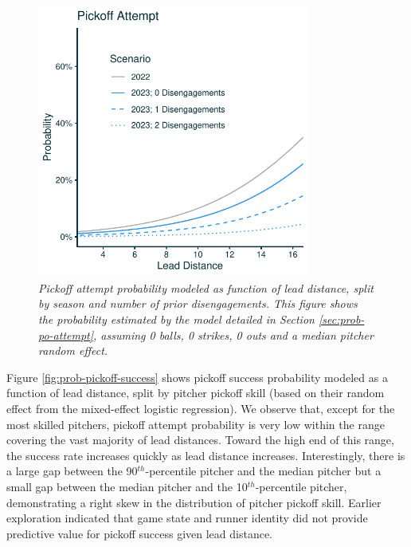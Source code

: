 \documentclass{article}
\begin{document}
      \begin{figure}
        \centering
        \includegraphics[width = 0.8\textwidth]{../../output/figures/prob_po_attempt_light.pdf}
        \caption{
          \it Pickoff attempt probability modeled as function of lead distance, split by season and number of prior disengagements. This figure shows the probability estimated by the model detailed in Section \ref{sec:prob-po-attempt}, assuming 0 balls, 0 strikes, 0 outs and a median pitcher random effect.
        }
        \label{fig:prob-pickoff-attempt}
      \end{figure}
      
      Figure \ref{fig:prob-pickoff-success} shows pickoff success probability modeled as a function of lead distance, split by pitcher pickoff skill (based on their random effect from the mixed-effect logistic regression). We observe that, except for the most skilled pitchers, pickoff attempt probability is very low within the range covering the vast majority of lead distances. Toward the high end of this range, the success rate increases quickly as lead distance increases. Interestingly, there is a large gap between the 90$^{th}$-percentile pitcher and the median pitcher but a small gap between the median pitcher and the 10$^{th}$-percentile pitcher, demonstrating a right skew in the distribution of pitcher pickoff skill. Earlier exploration indicated that game state and runner identity did not provide predictive value for pickoff success given lead distance.
  
\end{document}
